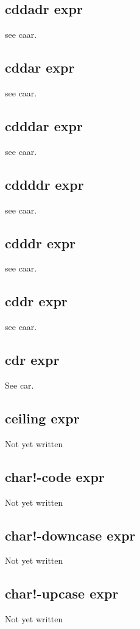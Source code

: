 \documentclass[a4paper,11pt]{article}
\begin{document}
{\subsection{\ttfamily cddadr expr}
see {\ttfamily caar}.

\subsection{\ttfamily cddar expr}
see {\ttfamily caar}.

\subsection{\ttfamily cdddar expr}
see {\ttfamily caar}.

\subsection{\ttfamily cddddr expr}
see {\ttfamily caar}.

\subsection{\ttfamily cdddr expr}
see {\ttfamily caar}.

\subsection{\ttfamily cddr expr}
see {\ttfamily caar}.

\subsection{\ttfamily cdr expr}
See {\ttfamily car}.

\subsection{\ttfamily ceiling expr}
Not yet written

\subsection{\ttfamily char!-code expr}
Not yet written

\subsection{\ttfamily char!-downcase expr}
Not yet written

\subsection{\ttfamily char!-upcase expr}
Not yet written

}
\end{document}
